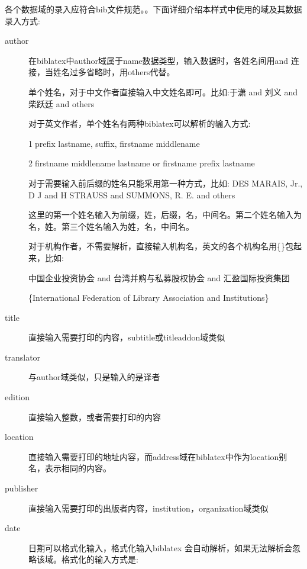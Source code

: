 各个数据域的录入应符合bib文件规范。。下面详细介绍本样式中使用的域及其数据录入方式:

\begin{description}
  \item[author] 在biblatex中author域属于name数据类型，输入数据时，各姓名间用and 连接，当姓名过多省略时，用others代替。

      单个姓名，对于中文作者直接输入中文姓名即可。比如:于潇 and 刘义 and 柴跃廷 and others

      对于英文作者，单个姓名有两种biblatex可以解析的输入方式:

      \textcircled{1}prefix lastname, suffix, firstname middlename

      \textcircled{2}firstname middlename lastname or firstname prefix lastname

      对于需要输入前后缀的姓名只能采用第一种方式，比如:
      DES MARAIS, Jr., D J and H STRAUSS and SUMMONS, R. E. and others

      这里的第一个姓名输入为前缀，姓，后缀，名，中间名。第二个姓名输入为名，姓。第三个姓名输入为姓，名，中间名。


      对于机构作者，不需要解析，直接输入机构名，英文的各个机构名用\{\}包起来，比如:

      中国企业投资协会 and 台湾并购与私募股权协会 and 汇盈国际投资集团

      \{International Federation of Library Association and Institutions\}

  \item[title] 直接输入需要打印的内容，subtitle或titleaddon域类似
  \item[translator] 与author域类似，只是输入的是译者
  \item[edition] 直接输入整数，或者需要打印的内容
  \item[location] 直接输入需要打印的地址内容，而address域在biblatex中作为location别名，表示相同的内容。
  \item[publisher] 直接输入需要打印的出版者内容，institution，organization域类似
  \item[date] 日期可以格式化输入，格式化输入biblatex 会自动解析，如果无法解析会忽略该域。格式化的输入方式是:


\end{description}
